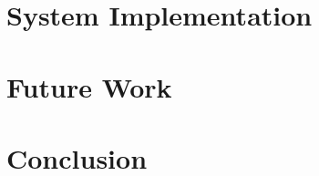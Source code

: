 \documentclass[12pt]{article}
\begin{document}
\section{System Implementation}\label{section4}


%


\section{Future Work}\label{section6}


\section{Conclusion}\label{section7}






%


\pagebreak

\end{document}
